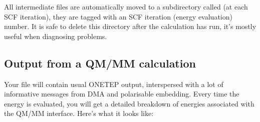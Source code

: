 \documentclass[letterpaper,10pt,english]{sphinxmanual}
\begin{document}
All intermediate files are automatically moved to a subdirectory called
 (at each SCF iteration), they are tagged with an SCF
iteration (energy evaluation) number. It is safe to delete this
directory after the calculation has run, it’s mostly useful when
diagnosing problems.


\subsection{Output from a QM/MM calculation}
\label{\detokenize{tinktep:output-from-a-qm-mm-calculation}}
Your  file will contain usual ONETEP output, interspersed
with a lot of informative messages from DMA and polarisable embedding.
Every time the energy is evaluated, you will get a detailed breakdown of
energies associated with the QM/MM interface. Here’s what it looks like:
\end{document}

